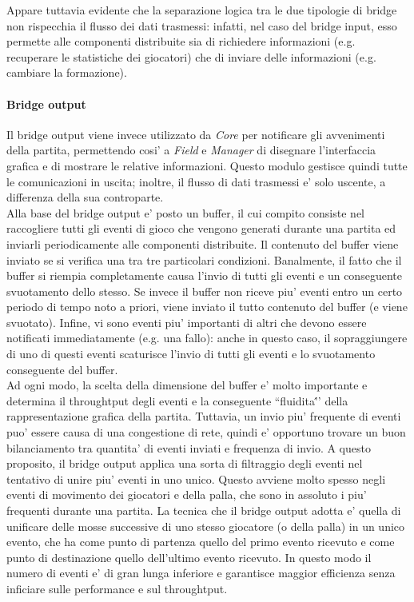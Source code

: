 Appare tuttavia evidente che la separazione logica tra le due tipologie di bridge non rispecchia il flusso dei dati trasmessi: infatti, nel caso del bridge input, esso permette alle componenti distribuite sia di richiedere informazioni (e.g. recuperare le statistiche dei giocatori) che di inviare delle informazioni (e.g. cambiare la formazione).\\

\paragraph{Bridge output}\label{sec:analisi_distribuzione_bridge_output} Il bridge output viene invece utilizzato da \textit{Core} per notificare gli avvenimenti della partita, permettendo cosi' a \textit{Field} e \textit{Manager} di disegnare l'interfaccia grafica e di mostrare le relative informazioni. Questo modulo gestisce quindi tutte le comunicazioni in uscita; inoltre, il flusso di dati trasmessi e' solo uscente, a differenza della sua controparte.\\

Alla base del bridge output e' posto un buffer, il cui compito consiste nel raccogliere tutti gli eventi di gioco che vengono generati durante una partita ed inviarli periodicamente alle componenti distribuite. Il contenuto del buffer viene inviato se si verifica una tra tre particolari condizioni. Banalmente, il fatto che il buffer si riempia completamente causa l'invio di tutti gli eventi e un conseguente svuotamento dello stesso. Se invece il buffer non riceve piu' eventi entro un certo periodo di tempo noto a priori, viene inviato il tutto contenuto del buffer (e viene svuotato). Infine, vi sono eventi piu' importanti di altri che devono essere notificati immediatamente (e.g. una fallo): anche in questo caso, il sopraggiungere di uno di questi eventi scaturisce l'invio di tutti gli eventi e lo svuotamento conseguente del buffer.\\

Ad ogni modo, la scelta della dimensione del buffer e' molto importante e determina il throughtput degli eventi e la conseguente ``fluidita\''' della rappresentazione grafica della partita. Tuttavia, un invio piu' frequente di eventi puo' essere causa di una congestione di rete, quindi e' opportuno trovare un buon bilanciamento tra quantita' di eventi inviati e frequenza di invio. A questo proposito, il bridge output applica una sorta di filtraggio degli eventi nel tentativo di unire piu' eventi in uno unico. Questo avviene molto spesso negli eventi di movimento dei giocatori e della palla, che sono in assoluto i piu' frequenti durante una partita. La tecnica che il bridge output adotta e' quella di unificare delle mosse successive di uno stesso giocatore (o della palla) in un unico evento, che ha come punto di partenza quello del primo evento ricevuto e come punto di destinazione quello dell'ultimo evento ricevuto. In questo modo il numero di eventi e' di gran lunga inferiore e garantisce maggior efficienza senza inficiare sulle performance e sul throughtput.

